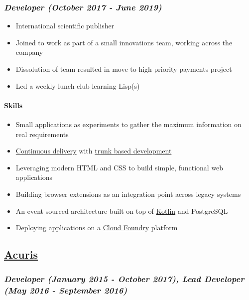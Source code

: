 \hypertarget{developer-october-2017---june-2019}{%
\subsubsection{\texorpdfstring{\emph{Developer (October 2017 - June
2019)}}{Developer (October 2017 - June 2019)}}\label{developer-october-2017---june-2019}}

\begin{itemize}
\tightlist
\item
  International scientific publisher
\item
  Joined to work as part of a small innovations team, working across the
  company
\item
  Dissolution of team resulted in move to high-priority payments project
\item
  Led a weekly lunch club learning Lisp(s)
\end{itemize}

\hypertarget{skills}{%
\paragraph{Skills}\label{skills}}

\begin{itemize}
\tightlist
\item
  Small applications as experiments to gather the maximum information on
  real requirements
\item
  \href{https://continuousdelivery.com/}{Continuous delivery} with
  \href{https://trunkbaseddevelopment.com/}{trunk based development}
\item
  Leveraging modern HTML and CSS to build simple, functional web
  applications
\item
  Building browser extensions as an integration point across legacy
  systems
\item
  An event sourced architecture built on top of
  \href{https://kotlinlang.org/}{Kotlin} and PostgreSQL
\item
  Deploying applications on a \href{https://www.cloudfoundry.org/}{Cloud
  Foundry} platform
\end{itemize}

\hypertarget{acuris-1}{%
\subsection{\texorpdfstring{\href{http://www.acuris.com/}{Acuris}}{Acuris}}\label{acuris-1}}

\hypertarget{developer-january-2015---october-2017-lead-developer-may-2016---september-2016}{%
\subsubsection{\texorpdfstring{\emph{Developer (January 2015 - October
2017), Lead Developer (May 2016 - September
2016)}}{Developer (January 2015 - October 2017), Lead Developer (May 2016 - September 2016)}}\label{developer-january-2015---october-2017-lead-developer-may-2016---september-2016}}

